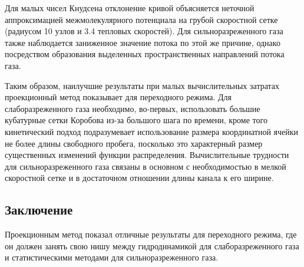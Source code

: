 \documentclass[a4paper,12pt]{article}
\begin{document}
Для малых чисел Кнудсена отклонение кривой объясняется неточной аппроксимацией межмолекулярного потенциала
на грубой скоростной сетке (радиусом 10 узлов и 3.4 тепловых скоростей).
Для сильноразреженного газа также наблюдается заниженное значение потока по этой же причине,
однако посредством образования выделенных пространственных направлений потока газа.

Таким образом, наилучшие результаты при малых вычислительных затратах проекционный метод показывает для переходного режима.
Для слаборазреженного газа необходимо, во-первых, использовать большие кубатурные сетки Коробова из-за большого шага по времени,
кроме того кинетический подход подразумевает использование размера координатной ячейки не более длины свободного пробега,
посколько это характерный размер существенных изменений функции распределения.
Вычислительные трудности для сильноразреженного газа связаны в основном с необходимостью в мелкой скоростной сетке
и в достаточном отношении длины канала к его ширине.

\subsection{Заключение}

Проекционным метод показал отличные результаты для переходного режима,
где он должен занять свою нишу между гидродинамикой для слаборазреженного газа
и статистическими методами для сильноразреженного газа.




\printbibliography
\end{document}
